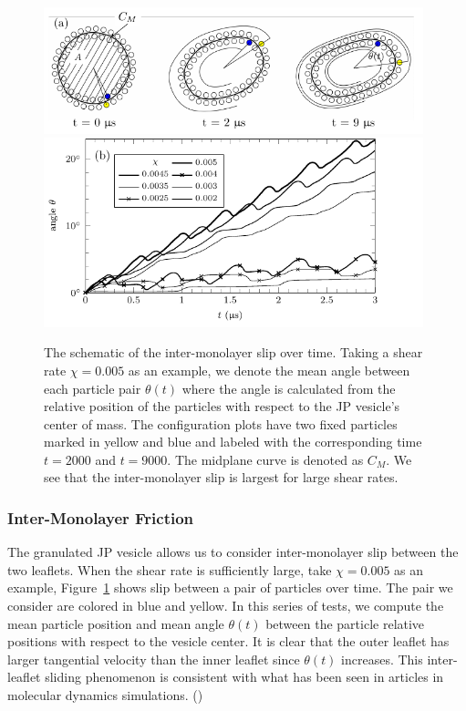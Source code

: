 \documentclass[lineno]{jfm}
\begin{document}
\begin{figure}
\begin{center}
\includegraphics[width=11cm]{Figure5_Wrapper.pdf}\\
\includegraphics[width=11cm]{Figure5B_Wrapper.pdf}
\end{center} 
  \caption{\label{figure5} The schematic of the inter-monolayer slip over
  time. Taking a shear rate $\chi=0.005$ as an example, we denote the
  mean angle between each particle pair $\theta(t)$ where the angle is
  calculated from the relative position of the particles with respect to
  the JP vesicle's center of mass. The configuration plots have two
  fixed particles marked in yellow and blue and labeled with the
  corresponding time $t=2000$ and $t=9000$. The midplane curve is
  denoted as $C_M$. We see that the inter-monolayer slip is largest
  for large shear rates.}
\end{figure}

\subsubsection{Inter-Monolayer Friction}

The granulated JP vesicle allows us to consider inter-monolayer slip
between the two leaflets. When the shear rate is sufficiently large,
take $\chi = 0.005$ as an example, Figure~\ref{figure5} shows slip
between a pair of particles over time. The pair we consider are colored
in blue and yellow. In this series of tests, we compute the mean
particle position and mean angle $\theta(t)$ between the particle
relative positions with respect to the vesicle center. It is clear that
the outer leaflet has larger tangential velocity than the inner leaflet
since $\theta(t)$ increases. This inter-leaflet sliding phenomenon is
consistent with what has been seen in articles in molecular dynamics
simulations. (\cite{Zgorski2019,denOtter2007})
\end{document}
